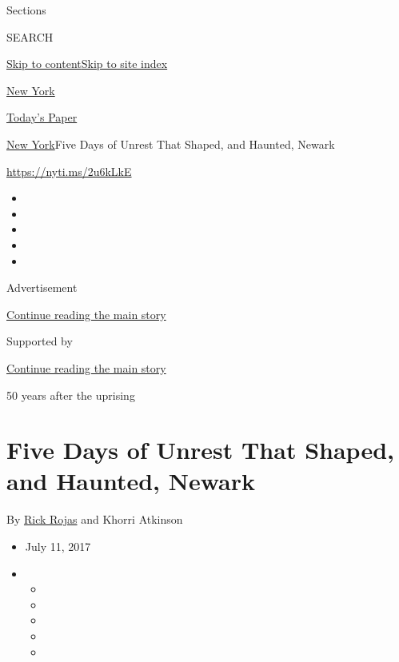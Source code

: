 Sections

SEARCH

\protect\hyperlink{site-content}{Skip to
content}\protect\hyperlink{site-index}{Skip to site index}

\href{https://www.nytimes3xbfgragh.onion/section/nyregion}{New York}

\href{https://myaccount.nytimes3xbfgragh.onion/auth/login?response_type=cookie\&client_id=vi}{}

\href{https://www.nytimes3xbfgragh.onion/section/todayspaper}{Today's
Paper}

\href{/section/nyregion}{New York}\textbar{}Five Days of Unrest That
Shaped, and Haunted, Newark

\url{https://nyti.ms/2u6kLkE}

\begin{itemize}
\item
\item
\item
\item
\item
\end{itemize}

Advertisement

\protect\hyperlink{after-top}{Continue reading the main story}

Supported by

\protect\hyperlink{after-sponsor}{Continue reading the main story}

50 years after the uprising

\hypertarget{five-days-of-unrest-that-shaped-and-haunted-newark}{%
\section{Five Days of Unrest That Shaped, and Haunted,
Newark}\label{five-days-of-unrest-that-shaped-and-haunted-newark}}

By \href{http://www.nytimes3xbfgragh.onion/by/rick-rojas}{Rick Rojas}
and Khorri Atkinson

\begin{itemize}
\item
  July 11, 2017
\item
  \begin{itemize}
  \item
  \item
  \item
  \item
  \item
  \end{itemize}
\end{itemize}


